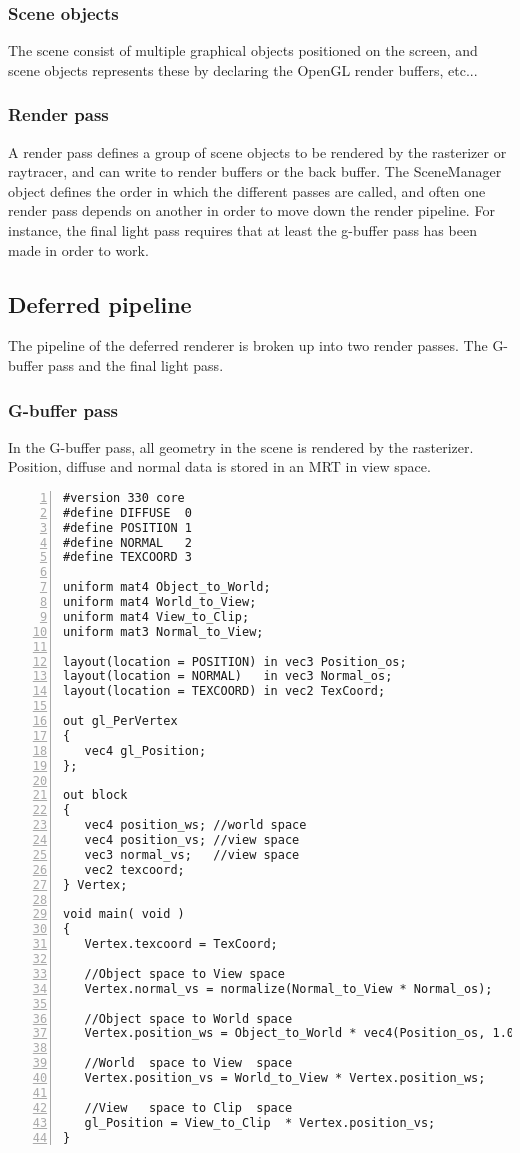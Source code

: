 \subsubsection{Scene objects}
The scene consist of multiple graphical objects positioned on the screen, and scene objects represents these by declaring the OpenGL render buffers, etc...

\subsubsection{Render pass}
A render pass defines a group of scene objects to be rendered by the rasterizer or raytracer, and can write to render buffers or the back buffer. The SceneManager object defines the order in which the different passes are called, and often one render pass depends on another in order to move down the render pipeline. For instance, the final light pass requires that at least the g-buffer pass has been made in order to work.

\subsection{Deferred pipeline}
The pipeline of the deferred renderer is broken up into two render passes. The G-buffer pass and the final light pass.

\subsubsection{G-buffer pass}
In the G-buffer pass, all geometry in the scene is rendered by the rasterizer. Position, diffuse and normal data is stored in an MRT in view space.

\begin{Verbatim}[frame=single, numbers=left, label=G-buffer vertex shader]
#version 330 core
#define DIFFUSE  0
#define POSITION 1
#define NORMAL   2
#define TEXCOORD 3

uniform mat4 Object_to_World;
uniform mat4 World_to_View;
uniform mat4 View_to_Clip;
uniform mat3 Normal_to_View;

layout(location = POSITION) in vec3 Position_os;
layout(location = NORMAL)   in vec3 Normal_os;
layout(location = TEXCOORD) in vec2 TexCoord;

out gl_PerVertex
{
   vec4 gl_Position;
};

out block
{
   vec4 position_ws; //world space
   vec4 position_vs; //view space
   vec3 normal_vs;   //view space
   vec2 texcoord;
} Vertex;

void main( void )
{	
   Vertex.texcoord = TexCoord;
	
   //Object space to View space
   Vertex.normal_vs = normalize(Normal_to_View * Normal_os);
	
   //Object space to World space
   Vertex.position_ws = Object_to_World * vec4(Position_os, 1.0);
	
   //World  space to View  space
   Vertex.position_vs = World_to_View * Vertex.position_ws;
	
   //View   space to Clip  space
   gl_Position = View_to_Clip  * Vertex.position_vs;
}
\end{Verbatim}


